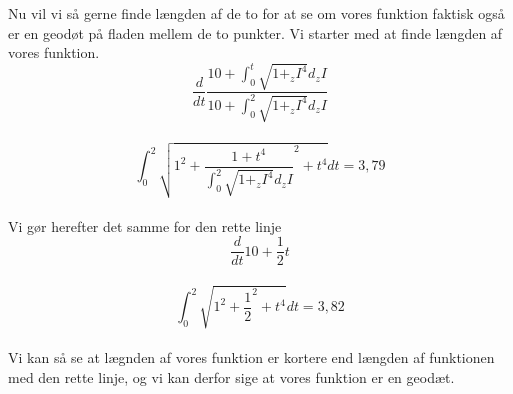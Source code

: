 Nu vil vi så gerne finde længden af de to for at se om vores funktion faktisk også er en geodøt på fladen mellem de to punkter. Vi starter med at finde længden af vores funktion. \\
$$ \frac{d}{dt} \frac{10+\int_{0}^{t}\sqrt{1+_zI^4}d_zI}{10+\int_{0}^{2}\sqrt{1+_zI^4}d_zI}$$ \\
$$ \int_{0}^{2}\sqrt{1^2+ \frac{1+t^4}{\int_{0}^{2}\sqrt{1+_zI^4}d_zI}^2+t^4}dt=3,79  $$\\
Vi gør herefter det samme for den rette linje \\
$$ \frac{d}{dt}10+ \frac{1}{2}t $$\\
$$\int_{0}^{2}\sqrt{1^2+\frac{1}{2}^2+t^4}dt=3,82 $$\\
Vi kan så se at lægnden af vores funktion er kortere end længden af funktionen med den rette linje, og vi kan derfor sige at vores funktion er en geodæt.
